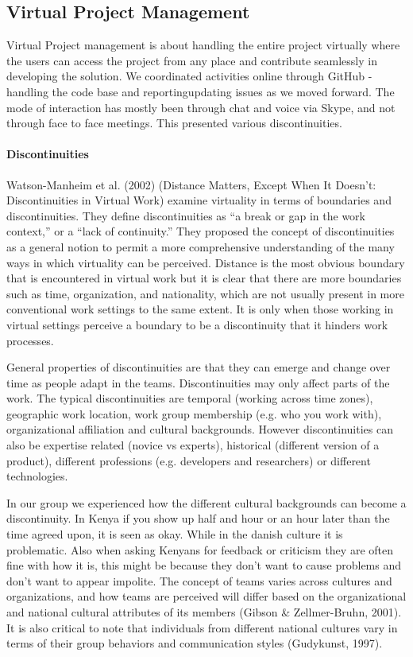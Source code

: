 \subsection{Virtual Project Management} \label{subsec:adaptationandadaptationprocess}
Virtual Project management is about handling the entire project virtually where the users can access the project from any place and contribute seamlessly in developing the solution. We coordinated activities online through GitHub - handling the code base and reporting\/updating issues as we moved forward. The mode of interaction has mostly been through chat and voice via Skype, and not through face to face meetings. This presented various discontinuities.

\paragraph{Discontinuities} \label{par:discontinuities}
Watson-Manheim et al. (2002) (Distance Matters, Except When It Doesn't: Discontinuities in Virtual Work) examine virtuality in terms of boundaries and discontinuities. They define discontinuities as “a break or gap in the work context,” or a “lack of continuity.” They proposed the concept of discontinuities as a general notion to permit a more comprehensive understanding of the many ways in which virtuality can be perceived.
Distance is the most obvious boundary that is encountered in virtual work but it is clear that there are more boundaries such as time, organization, and nationality, which are not usually present in more conventional work settings to the same extent. It is only when those working in virtual settings perceive a boundary to be a discontinuity that it hinders work processes. 

General properties of discontinuities are that they can emerge and change over time as people adapt in the teams. Discontinuities may only affect parts of the work. The typical discontinuities are temporal (working across time zones), geographic work location, work group membership (e.g. who you work with), organizational affiliation and cultural backgrounds. However discontinuities can also be expertise related (novice vs experts), historical (different version of a product), different professions (e.g. developers and researchers) or different technologies.

In our group we experienced how the different cultural backgrounds can become a discontinuity. In Kenya if you show up half and hour or an hour later than the time agreed upon, it is seen as okay. While in the danish culture it is problematic. Also when asking Kenyans for feedback or criticism they are often fine with how it is, this might be because they don't want to cause problems and don't want to appear impolite. 
The concept of teams varies across cultures and organizations, and how teams are perceived will differ based on the organizational and national cultural attributes of its members (Gibson \& Zellmer-Bruhn, 2001). It is also critical to note that individuals from different national cultures vary in terms of their group behaviors and communication styles (Gudykunst, 1997).

